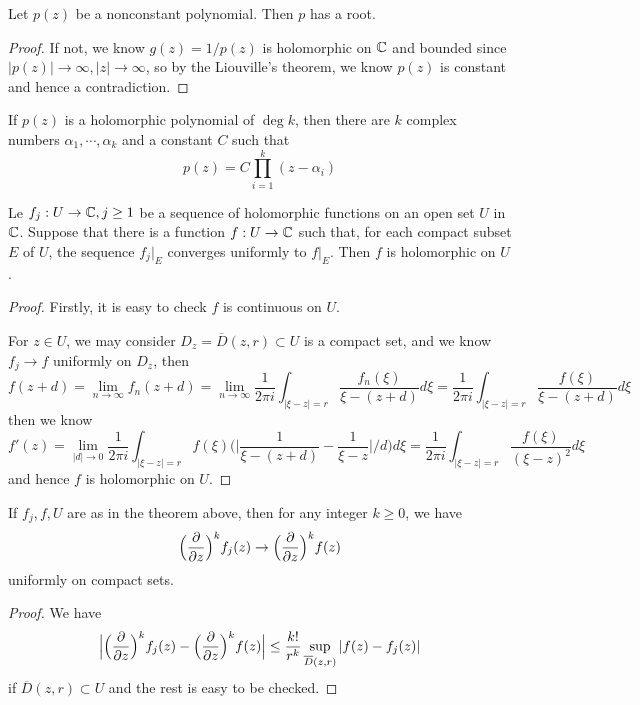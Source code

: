 \begin{theorem}
    Let $p(z)$ be a nonconstant polynomial. Then $p$ has a root.
\end{theorem}
\begin{proof}\par
    If not, we know $g(z) = 1/p(z)$ is holomorphic on $\mathbb{C}$ and bounded since $|p(z)| \to\infty , |z|\to\infty$, so by the Liouville's theorem, we know $p(z)$ is constant and hence a contradiction.
\end{proof}

\begin{corollary}
    If $p(z)$ is a holomorphic polynomial of $\deg k$, then there are $k$ complex numbers $\alpha_1,\cdots,\alpha_k$ and a constant $C$ such that
    \[p(z) = C\prod_{i=1}^k(z-\alpha_i)\]
\end{corollary}

\begin{theorem}
    Le $f_j:U\to\mathbb{C}, j\geq 1$ be a sequence of holomorphic functions on an open set $U$ in $\mathbb{C}$. Suppose that there is a function $f:U\to\mathbb{C}$ such that, for each compact subset $E$ of $U$, the sequence $f_j|_E$ converges uniformly to $f|_E$. Then $f$ is holomorphic on $U$. 
\end{theorem}
\begin{proof}\par
    Firstly, it is easy to check $f$ is continuous on $U$.\par
    For $z\in U$, we may consider $D_z = \overline{D}(z,r) \subset U$ is a compact set, and we know $f_j\to f$ uniformly on $D_z$, then
    \[
    f(z+d) = \lim_{n\to\infty} f_n(z+d) = \lim_{n\to\infty} \dfrac{1}{2\pi i}\int_{|\xi-z| = r}\dfrac{f_n(\xi)}{\xi - (z+d)}d\xi = \dfrac{1}{2\pi i }\int_{|\xi-z| = r}\dfrac{f(\xi)}{\xi - (z+d)}d\xi
    \]
    then we know
    \[
    f'(z) = \lim_{|d|\to 0} \dfrac{1}{2\pi i}\int_{|\xi-z|=r} f(\xi)\Big(\Big|\dfrac{1}{\xi-(z+d)}-\dfrac{1}{\xi-z}\Big|/d\Big) d\xi = \dfrac{1}{2\pi i}\int_{|\xi-z|=r} \dfrac{f(\xi)}{(\xi-z)^2} d\xi
    \]
    and hence $f$ is holomorphic on $U$.
\end{proof}

\begin{corollary}
    If $f_j,f,U$ are as in the theorem above, then for any integer $k\geq 0$, we have
    \[
    \Big(\dfrac{\partial}{\partial z}\Big)^k f_j(z) \to \Big(\dfrac{\partial}{\partial z}\Big)^k f(z)
    \]
    uniformly on compact sets.
\end{corollary}
\begin{proof}
    We have
    \[
    \Big|\Big(\dfrac{\partial}{\partial z}\Big)^k f_j(z) -  \Big(\dfrac{\partial}{\partial z}\Big)^k f(z)\Big| \leq \dfrac{k!}{r^k} \sup_{\overline{D}(z,r)}|f(z)-f_j(z)|
    \]
    if $\overline{D}(z,r) \subset U$ and the rest is easy to be checked.
\end{proof}

